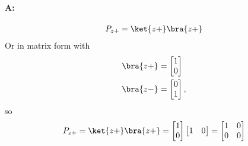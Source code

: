 \paragraph{A:}
%
\begin{equation}\label{eqn:PHY356HNov2:100}
\begin{aligned}
P_{z+} = \ket{z+}\bra{z+}
\end{aligned}
\end{equation}
%
Or in matrix form with
%
\begin{equation}\label{eqn:PHY356HNov2:105}
\begin{aligned}
\bra{z+} &=
\begin{bmatrix}
1 \\
0
\end{bmatrix} \\
\bra{z-} &=
\begin{bmatrix}
0 \\
1
\end{bmatrix},
\end{aligned}
\end{equation}
%
so
\begin{equation}\label{eqn:PHY356HNov2:110}
\begin{aligned}
P_{z+} = \ket{z+}\bra{z+} =
\begin{bmatrix}
1 \\
0
\end{bmatrix}
\begin{bmatrix}
1 & 0
\end{bmatrix}
=
\begin{bmatrix}
1 & 0 \\
0 & 0
\end{bmatrix}
\end{aligned}
\end{equation}
%
